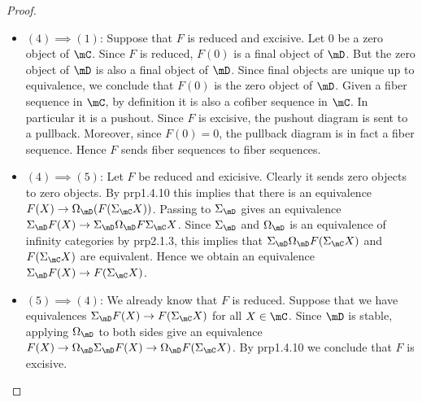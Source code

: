 \documentclass[a4paper]{article}
\begin{document}
\begin{prp}{}{}
\begin{proof}
\begin{itemize}
\item $(4)\implies (1)$: Suppose that $F$ is reduced and excisive. Let $0$ be a zero object of $\mC$. Since $F$ is reduced, $F(0)$ is a final object of $\mD$. But the zero object of $\mD$ is also a final object of $\mD$. Since final objects are unique up to equivalence, we conclude that $F(0)$ is the zero object of $\mD$. Given a fiber sequence in $\mC$, by definition it is also a cofiber sequence in $\mC$. In particular it is a pushout. Since $F$ is excisive, the pushout diagram is sent to a pullback. Moreover, since $F(0)=0$, the pullback diagram is in fact a fiber sequence. Hence $F$ sends fiber sequences to fiber sequences. \\

\item $(4)\implies(5)$: Let $F$ be reduced and exicisive. Clearly it sends zero objects to zero objects. By prp1.4.10 this implies that there is an equivalence $F(X)\to\Omega_\mD(F(\Sigma_\mC X))$. Passing to $\Sigma_\mD$ gives an equivalence $\Sigma_\mD F(X)\to\Sigma_\mD\Omega_\mD F\Sigma_\mC X$. Since $\Sigma_\mD$ and $\Omega_\mD$ is an equivalence of infinity categories by prp2.1.3, this implies that $\Sigma_\mD\Omega_\mD F(\Sigma_\mC X)$ and $F(\Sigma_\mC X)$ are equivalent. Hence we obtain an equivalence $\Sigma_\mD F(X)\to F(\Sigma_\mC X)$. \\

\item $(5)\implies(4)$: We already know that $F$ is reduced. Suppose that we have equivalences $\Sigma_\mD F(X)\to F(\Sigma_\mC X)$ for all $X\in\mC$. Since $\mD$ is stable, applying $\Omega_\mD$ to both sides give an equivalence $F(X)\to \Omega_\mD\Sigma_\mD F(X)\to\Omega_\mD F(\Sigma_\mC X)$. By prp1.4.10 we conclude that $F$ is excisive. 
\end{itemize}
\end{proof}
\end{prp}
\end{document}
